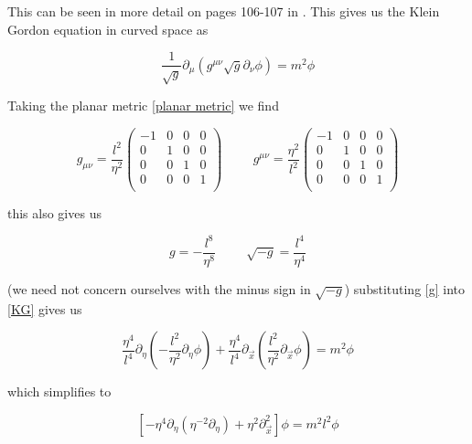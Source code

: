 \documentclass[a4paper,11pt]{article}
\numberwithin{equation}{section}
\numberwithin{figure}{section}
\begin{document}
\begin{large}
This can be seen in more detail on pages 106-107 in \cite{Weinberg}. This gives us the Klein Gordon equation in curved space as

\begin{equation}
\label{KG}
    \frac{1}{\sqrt{g}}\partial_\mu (g^{\mu\nu}\sqrt{g}\partial_\nu \phi)=m^2\phi
\end{equation}

\newpage

Taking the planar metric \eqref{planar metric} we find 

\begin{equation}
\label{gmunu}    
    g_{\mu\nu}=\frac{l^2}{\eta^2} \begin{pmatrix}
    -1&0&0&0\\
      0&1&0&0\\
      0&0&1&0\\
      0&0&0&1\\
    \end{pmatrix}
    \hspace{1cm}
    g^{\mu\nu}=\frac{\eta^2}{l^2} \begin{pmatrix}
    -1&0&0&0\\
      0&1&0&0\\
      0&0&1&0\\
      0&0&0&1\\
    \end{pmatrix}
\end{equation}

this also gives us 

\begin{equation}
\label{g}    
    g=-\frac{l^8}{\eta^8} \hspace{1cm} \sqrt{-g}=\frac{l^4}{\eta^4}
\end{equation}

(we need not concern ourselves with the minus sign in $\sqrt{-g}$) substituting \eqref{g} into \eqref{KG}  gives us

\begin{equation}
\label{DE1}
    \frac{\eta^4}{l^4}\partial_\eta(-\frac{l^2}{\eta^2}\partial_\eta\phi) +\frac{\eta^4}{l^4}\partial_{\Vec{x}} (\frac{l^2}{\eta^2}\partial_{\Vec{x}}\phi)=m^2\phi
\end{equation}

which simplifies to

\begin{equation}
\label{DE}    
    [-\eta^4\partial_\eta(\eta^{-2}\partial_\eta)+\eta^2\partial^2_{\Vec{x}}]\phi=m^2l^2\phi
\end{equation}


\end{large}
\end{document}
